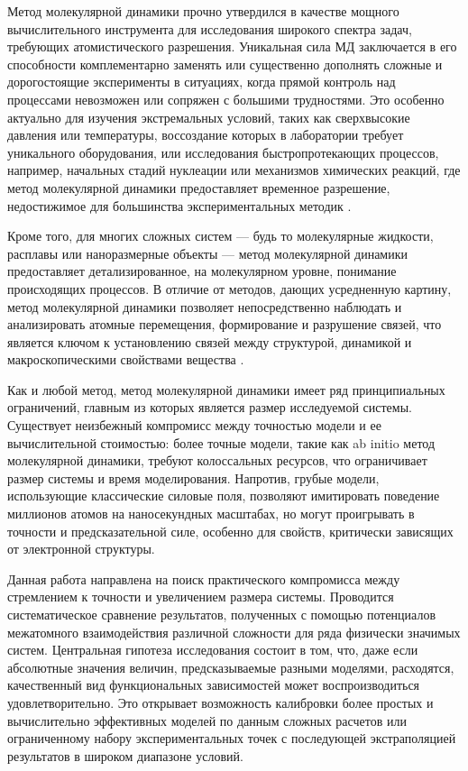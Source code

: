 
{\actuality} 

Метод молекулярной динамики прочно утвердился в качестве мощного вычислительного инструмента для исследования широкого спектра задач, требующих атомистического разрешения. Уникальная сила МД заключается в его способности комплементарно заменять или существенно дополнять сложные и дорогостоящие эксперименты в ситуациях, когда прямой контроль над процессами невозможен или сопряжен с большими трудностями. Это особенно актуально для изучения экстремальных условий, таких как сверхвысокие давления или температуры, воссоздание которых в лаборатории требует уникального оборудования, или исследования быстропротекающих процессов, например, начальных стадий нуклеации или механизмов химических реакций, где метод молекулярной динамики предоставляет временное разрешение, недостижимое для большинства экспериментальных методик .

Кроме того, для многих сложных систем — будь то молекулярные жидкости, расплавы или наноразмерные объекты — метод молекулярной динамики предоставляет детализированное, на молекулярном уровне, понимание происходящих процессов. В отличие от методов, дающих усредненную картину, метод молекулярной динамики позволяет непосредственно наблюдать и анализировать атомные перемещения, формирование и разрушение связей, что является ключом к установлению связей между структурой, динамикой и макроскопическими свойствами вещества .

Как и любой метод, метод молекулярной динамики имеет ряд принципиальных ограничений, главным из которых является размер исследуемой системы. Существует неизбежный компромисс между точностью модели и ее вычислительной стоимостью: более точные модели, такие как ab initio метод молекулярной динамики, требуют колоссальных ресурсов, что ограничивает размер системы и время моделирования. Напротив, грубые модели, использующие классические силовые поля, позволяют имитировать поведение миллионов атомов на наносекундных масштабах, но могут проигрывать в точности и предсказательной силе, особенно для свойств, критически зависящих от электронной структуры.

Данная работа направлена на поиск практического компромисса между стремлением к точности и увеличением размера системы. Проводится систематическое сравнение результатов, полученных с помощью потенциалов межатомного взаимодействия различной сложности для ряда физически значимых систем. Центральная гипотеза исследования состоит в том, что, даже если абсолютные значения величин, предсказываемые разными моделями, расходятся, качественный вид функциональных зависимостей может воспроизводиться удовлетворительно. Это открывает возможность калибровки более простых и вычислительно эффективных моделей по данным сложных расчетов или ограниченному набору экспериментальных точек с последующей экстраполяцией результатов в широком диапазоне условий.


